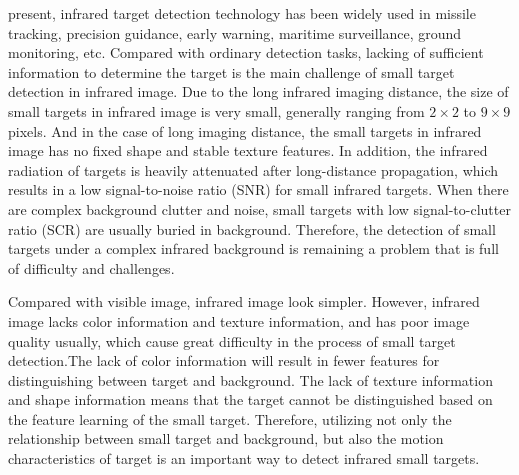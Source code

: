 \documentclass[journal]{IEEEtran}
\begin{document}
 present, infrared target detection technology has been widely used in missile tracking, precision guidance, early warning, maritime surveillance, ground monitoring\cite{luo2015space,dawson2010space,li2014infrared}, etc. Compared with ordinary detection tasks, lacking of sufficient information to determine the target is the main challenge of small target detection in infrared image. Due to the long infrared imaging distance, the size of small targets in infrared image is very small, generally ranging from $2\times2$ to $9\times9$ pixels\cite{wang2017infrared}. And in the case of long imaging distance, the small targets in infrared image has no fixed shape and stable texture features. In addition, the infrared radiation of targets is heavily attenuated after long-distance propagation, which results in a low signal-to-noise ratio (SNR) for small infrared targets\cite{li2016novel}. When there are complex background clutter and noise, small targets with low signal-to-clutter ratio (SCR) are usually buried in background. Therefore, the detection of small targets under a complex infrared background is remaining a problem that is full of difficulty and challenges.

Compared with visible image, infrared image look simpler. However, infrared image lacks color information and texture information, and has poor image quality usually, which cause great difficulty in the process of small target detection.The lack of color information will result in fewer features for distinguishing between target and background. The lack of texture information and shape information means that the target cannot be distinguished based on the feature learning of the small target. Therefore, utilizing not only the relationship between small target and background, but also the motion characteristics of target is an important way to detect infrared small targets.
\end{document}
